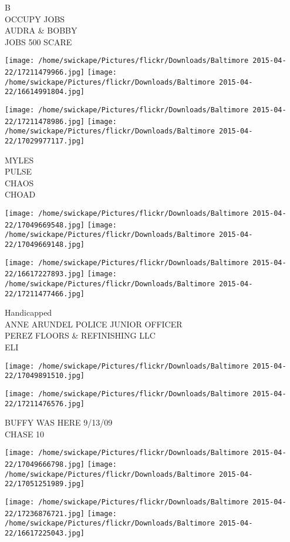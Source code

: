 \documentclass[10pt,letterpaper]{article}
\begin{document}
B\\
OCCUPY JOBS\\
AUDRA \& BOBBY\\
JOBS 500 SCARE
\pagebreak

\texttt{[image: /home/swickape/Pictures/flickr/Downloads/Baltimore 2015-04-22/17211479966.jpg]}
\texttt{[image: /home/swickape/Pictures/flickr/Downloads/Baltimore 2015-04-22/16614991804.jpg]}

\texttt{[image: /home/swickape/Pictures/flickr/Downloads/Baltimore 2015-04-22/17211478986.jpg]}
\texttt{[image: /home/swickape/Pictures/flickr/Downloads/Baltimore 2015-04-22/17029977117.jpg]}

MYLES\\
PULSE\\
CHAOS\\
CHOAD
\pagebreak

\texttt{[image: /home/swickape/Pictures/flickr/Downloads/Baltimore 2015-04-22/17049669548.jpg]}
\texttt{[image: /home/swickape/Pictures/flickr/Downloads/Baltimore 2015-04-22/17049669148.jpg]}

\texttt{[image: /home/swickape/Pictures/flickr/Downloads/Baltimore 2015-04-22/16617227893.jpg]}
\texttt{[image: /home/swickape/Pictures/flickr/Downloads/Baltimore 2015-04-22/17211477466.jpg]}

Handicapped\\
ANNE ARUNDEL POLICE JUNIOR OFFICER\\
PEREZ FLOORS \& REFINISHING LLC\\
ELI
\pagebreak

\texttt{[image: /home/swickape/Pictures/flickr/Downloads/Baltimore 2015-04-22/17049891510.jpg]}

\vspace{0.25in}
\texttt{[image: /home/swickape/Pictures/flickr/Downloads/Baltimore 2015-04-22/17211476576.jpg]}

BUFFY WAS HERE 9/13/09\\
CHASE 10
\pagebreak

\texttt{[image: /home/swickape/Pictures/flickr/Downloads/Baltimore 2015-04-22/17049666798.jpg]}
\texttt{[image: /home/swickape/Pictures/flickr/Downloads/Baltimore 2015-04-22/17051251989.jpg]}

\texttt{[image: /home/swickape/Pictures/flickr/Downloads/Baltimore 2015-04-22/17236876721.jpg]}
\texttt{[image: /home/swickape/Pictures/flickr/Downloads/Baltimore 2015-04-22/16617225043.jpg]}
\end{document}
